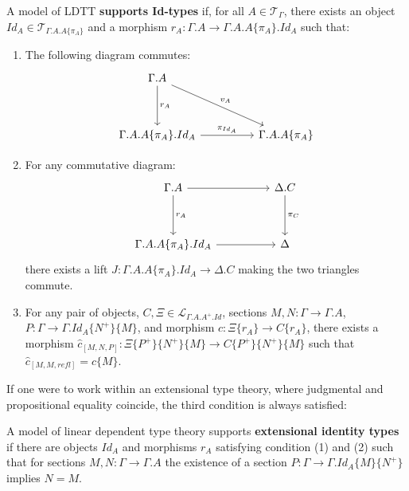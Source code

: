 \documentclass[a4paper,english]{lipics-v2018}
\begin{document}
\begin{definition}[Id-types]\label{idsemantic}
  A model of LDTT \textbf{supports Id-types} if, for all $A \in \mathcal{T}_{\Gamma}$, there exists an object $Id_A \in \mathcal{T}_{\Gamma.A.A\{\pi_A\}}$ and a morphism $r_A : \Gamma.A \to \Gamma.A.A\{\pi_A\}.Id_{A}$ such that:
  \begin{enumerate}
    \item The following diagram commutes:
  \[
    \begin{tikzcd}[row sep=huge, column sep=huge]
    \Gamma.A \ar[d, "r_A"] \ar[rd, "v_A"]\\
    \Gamma.A.A\{\pi_A\}.Id_A \ar[r, "\pi_{Id_A}"] & \Gamma.A.A\{\pi_A\}
    \end{tikzcd}
  \]
\item For any commutative diagram:
  \[
    \begin{tikzcd}[row sep=huge, column sep=huge]
    \Gamma.A \ar[d, "r_A"] \ar[r] & \Delta.C \ar[d, "\pi_C"]\\
    \Gamma.A.A\{\pi_A\}.Id_A \ar[r] & \Delta
    \end{tikzcd}
  \]
  there exists a lift $J: \Gamma.A.A\{\pi_A\}.Id_A \to \Delta.C$ making the two triangles commute.
\item For any pair of objects, $C, \Xi \in \mathcal{L}_{\Gamma.A.A^+.Id}$, sections $M, N : \Gamma \to \Gamma.A$, $P : \Gamma \to \Gamma.Id_A\{N^+\}\{M\}$, and morphism $c : \Xi\{r_A\} \to C\{r_A\}$, there exists a morphism $\hat c_{[M,N,P]} : \Xi\{P^+\}\{N^+\}\{M\} \to C\{P^+\}\{N^+\}\{M\}$ such that $\hat c_{[M,M,refl]} = c\{M\}$.
\end{enumerate}
\end{definition}
If one were to work within an extensional type theory, where judgmental and propositional equality coincide, the third condition is always satisfied:
\begin{definition}A model of linear dependent type theory supports \textbf{extensional identity types} if there are objects $Id_A$ and morphisms $r_A$ satisfying condition (1) and (2) such that for sections $M,N : \Gamma \to \Gamma.A$ the existence of a section $P : \Gamma \to \Gamma.Id_A\{M\}\{N^+\}$ implies $N = M$.
\end{definition}
\end{document}
